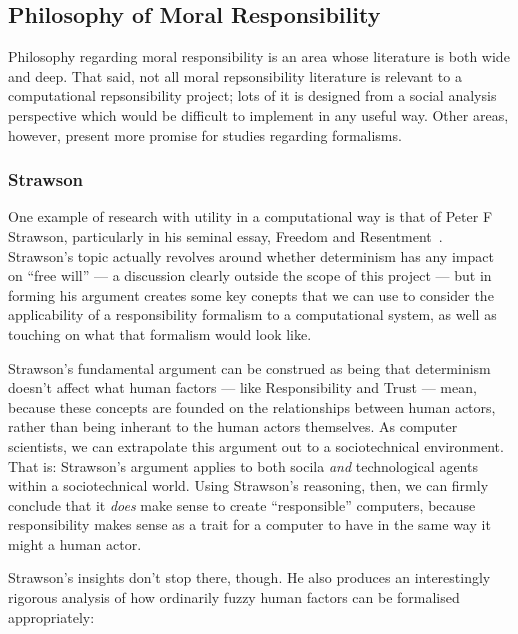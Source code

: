\subsection{Philosophy of Moral Responsibility}
Philosophy regarding moral responsibility is an area whose literature is both wide and deep. That said, not all moral repsonsibility literature is relevant to a computational repsonsibility project; lots of it is designed from a social analysis perspective which would be difficult to implement in any useful way. Other areas, however, present more promise for studies regarding formalisms.\par

\subsubsection{Strawson}
One example of research with utility in a computational way is that of Peter F Strawson, particularly in his seminal essay, Freedom and Resentment~\cite{strawson}. Strawson's topic actually revolves around whether determinism has any impact on ``free will'' --- a discussion clearly outside the scope of this project --- but in forming his argument creates some key conepts that we can use to consider the applicability of a responsibility formalism to a computational system, as well as touching on what that formalism would look like.\par

Strawson's fundamental argument can be construed as being that determinism doesn't affect what human factors --- like Responsibility and Trust --- mean, because these concepts are founded on the relationships between human actors, rather than being inherant to the human actors themselves. As computer scientists, we can extrapolate this argument out to a sociotechnical environment. That is: Strawson's argument applies to both socila \emph{and} technological agents within a sociotechnical world. Using Strawson's reasoning, then, we can firmly conclude that it \emph{does} make sense to create ``responsible'' computers, because responsibility makes sense as a trait for a computer to have in the same way it might a human actor.\par

Strawson's insights don't stop there, though. He also produces an interestingly rigorous analysis of how ordinarily fuzzy human factors can be formalised appropriately:

